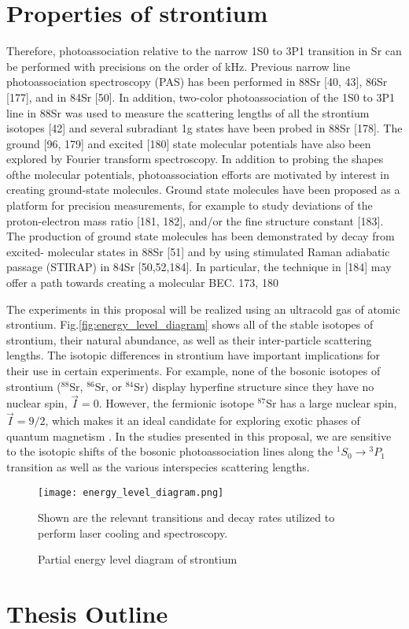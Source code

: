 \section{Properties of strontium}
\label{sec:sr}

Therefore, photoassociation relative to the narrow 1S0 to 3P1 transition in Sr can be performed with precisions on the order of kHz. Previous narrow line photoassociation spectroscopy (PAS) has been performed in 88Sr [40, 43], 86Sr [177], and in 84Sr [50]. In addition, two-color photoassociation of the 1S0 to 3P1 line in 88Sr was used to measure the scattering lengths of all the strontium isotopes [42] and several subradiant 1g states have been probed in 88Sr [178]. The ground [96, 179] and excited [180] state molecular potentials have also been explored by Fourier transform spectroscopy.
In addition to probing the shapes ofthe molecular potentials, photoassociation efforts
are motivated by interest in creating ground-state molecules. Ground state molecules have been proposed as a platform for precision measurements, for example to study deviations of the proton-electron mass ratio [181, 182], and/or the fine structure constant [183]. The production of ground state molecules has been demonstrated by decay from excited- molecular states in 88Sr [51] and by using stimulated Raman adiabatic passage (STIRAP) in 84Sr [50,52,184]. In particular, the technique in [184] may offer a path towards creating a molecular BEC.
173, 180



	

The experiments in this proposal will be realized using an ultracold gas of atomic strontium. Fig.\;\ref{fig:energy_level_diagram} shows all of the stable isotopes of strontium, their natural abundance, as well as their inter-particle scattering lengths. The isotopic differences in strontium have important implications for their use in certain experiments. For example, none of the bosonic isotopes of strontium ($^{88}$Sr, $^{86}$Sr, or $^{84}$Sr) display hyperfine structure since they have no nuclear spin, $\vec{I}=0$. However, the fermionic isotope $^{87}$Sr has a large nuclear spin, $\vec{I}=9/2$, which makes it an ideal candidate for exploring exotic phases of quantum magnetism \cite{Beverland2016,Cazalilla2014,Chen2015}. In the studies presented in this proposal, we are sensitive to the isotopic shifts of the bosonic photoassociation lines along the $^1S_0\!\rightarrow\!^3P_1$ transition as well as the various interspecies scattering lengths.

	\begin{figure} 
		\centerline{
		\texttt{[image: energy\_level\_diagram.png]}}
		\caption{Partial energy level diagram of strontium}{Shown are the relevant transitions and decay rates utilized to perform laser cooling and spectroscopy.}
		\label{fig:energyLevels}
	\end{figure}



\section{Thesis Outline}
\label{sec:outline}

